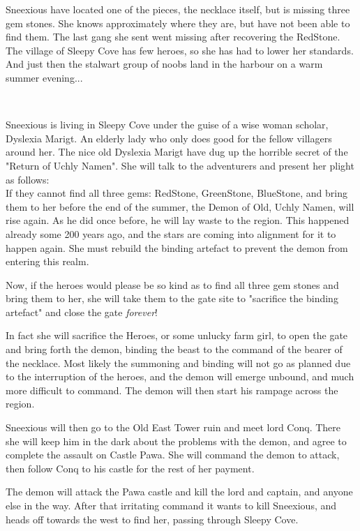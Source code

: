 Sneexious have located one of the pieces, the necklace itself, but is missing three gem stones. She knows approximately where they are, but have not been able to find them. The last gang she sent went missing after recovering the RedStone. The village of Sleepy Cove has few heroes, so she has had to lower her standards. And just then the stalwart group of noobs land in the harbour on a warm summer evening...

\

Sneexious is living in Sleepy Cove under the guise of a wise woman scholar, Dyslexia Marigt. An elderly lady who only does good for the fellow villagers around her. The nice old Dyslexia Marigt have dug up the horrible secret of the "Return of Uchly Namen". She will talk to the adventurers and present her plight as follows: \\
If they cannot find all three gems: RedStone, GreenStone, BlueStone, and bring them to her before the end of the summer, the Demon of Old, Uchly Namen, will rise again. As he did once before, he will lay waste to the region. This happened already some 200 years ago, and the stars are coming into alignment for it to happen again. She must rebuild the binding artefact to prevent the demon from entering this realm.

Now, if the heroes would please be so kind as to find all three gem stones and bring them to her, she will take them to the gate site to "sacrifice the binding artefact" and close the gate \emph{forever}!

In fact she will sacrifice the Heroes, or some unlucky farm girl, to open the gate and bring forth the demon, binding the beast to the command of the bearer of the necklace.
Most likely the summoning and binding will not go as planned due to the interruption of the heroes, and the demon will emerge unbound, and much more difficult to command. The demon will then start his rampage across the region.

Sneexious will then go to the Old East Tower ruin and meet lord Conq. There she will keep him in the dark about the problems with the demon, and agree to complete the assault on Castle Pawa. She will command the demon to attack, then follow Conq to his castle for the rest of her payment.

The demon will attack the Pawa castle and kill the lord and captain, and anyone else in the way. After that irritating command it wants to kill Sneexious, and heads off towards the west to find her, passing through Sleepy Cove.

